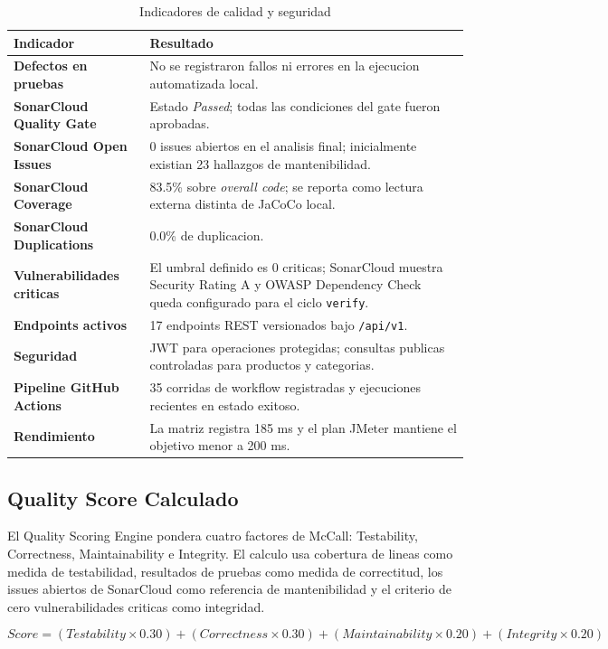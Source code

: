 \documentclass[11pt,oneside]{article}
\begin{document}
\begin{table}[H]
\centering
\small
\caption{Indicadores de calidad y seguridad}
\begin{tabularx}{\textwidth}{>{\bfseries}p{}Y}
\toprule
Indicador & Resultado\\
\midrule
Defectos en pruebas & No se registraron fallos ni errores en la ejecucion automatizada local.\\
SonarCloud Quality Gate & Estado \textit{Passed}; todas las condiciones del gate fueron aprobadas.\\
SonarCloud Open Issues & 0 issues abiertos en el analisis final; inicialmente existian 23 hallazgos de mantenibilidad.\\
SonarCloud Coverage & 83.5\% sobre \textit{overall code}; se reporta como lectura externa distinta de JaCoCo local.\\
SonarCloud Duplications & 0.0\% de duplicacion.\\
Vulnerabilidades criticas & El umbral definido es 0 criticas; SonarCloud muestra Security Rating A y OWASP Dependency Check queda configurado para el ciclo \texttt{verify}.\\
Endpoints activos & 17 endpoints REST versionados bajo \texttt{/api/v1}.\\
Seguridad & JWT para operaciones protegidas; consultas publicas controladas para productos y categorias.\\
Pipeline GitHub Actions & 35 corridas de workflow registradas y ejecuciones recientes en estado exitoso.\\
Rendimiento & La matriz registra 185 ms y el plan JMeter mantiene el objetivo menor a 200 ms.\\
\bottomrule
\end{tabularx}
\end{table}

\subsection{Quality Score Calculado}

El Quality Scoring Engine pondera cuatro factores de McCall: Testability, Correctness, Maintainability e Integrity. El calculo usa cobertura de lineas como medida de testabilidad, resultados de pruebas como medida de correctitud, los issues abiertos de SonarCloud como referencia de mantenibilidad y el criterio de cero vulnerabilidades criticas como integridad.

\[
Score = (Testability \times 0.30) + (Correctness \times 0.30) + (Maintainability \times 0.20) + (Integrity \times 0.20)
\]
\end{document}
